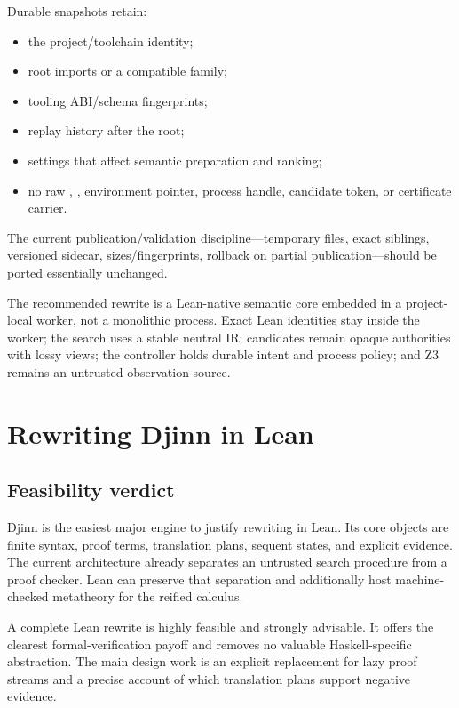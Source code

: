 \documentclass[10pt,letterpaper,oneside]{report}
\newcommand{\code}[1]{\texttt{\detokenize{#1}}}
\begin{document}
Durable snapshots retain:

\begin{itemize}
  \item the project/toolchain identity;
  \item root imports or a compatible \code{.olean} family;
  \item tooling ABI/schema fingerprints;
  \item replay history after the root;
  \item settings that affect semantic preparation and ranking;
  \item no raw \code{Expr}, \code{FVarId}, environment pointer, process handle, candidate token, or certificate carrier.
\end{itemize}

The current publication/validation discipline---temporary files, exact siblings, versioned sidecar, sizes/fingerprints, rollback on partial publication---should be ported essentially unchanged.

\begin{summarybox}
The recommended rewrite is a Lean-native semantic core embedded in a project-local worker, not a monolithic process. Exact Lean identities stay inside the worker; the search uses a stable neutral IR; candidates remain opaque authorities with lossy views; the controller holds durable intent and process policy; and Z3 remains an untrusted observation source.
\end{summarybox}

\chapter{Rewriting Djinn in Lean}\label{ch:djinn}

\section{Feasibility verdict}

Djinn is the easiest major engine to justify rewriting in Lean. Its core objects are finite syntax, proof terms, translation plans, sequent states, and explicit evidence. The current architecture already separates an untrusted search procedure from a proof checker. Lean can preserve that separation and additionally host machine-checked metatheory for the reified calculus.

\begin{verdictbox}[title={Djinn verdict}]
A complete Lean rewrite is highly feasible and strongly advisable. It offers the clearest formal-verification payoff and removes no valuable Haskell-specific abstraction. The main design work is an explicit replacement for lazy proof streams and a precise account of which translation plans support negative evidence.
\end{verdictbox}
\end{document}
